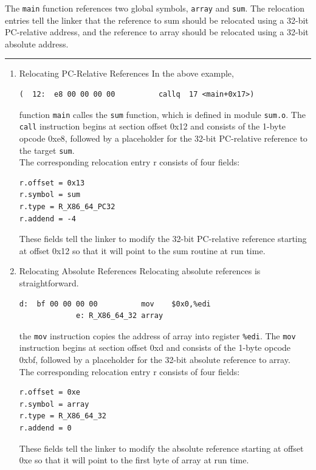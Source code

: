 \documentclass[11pt]{article}
\begin{document}
The \texttt{main} function references two global symbols, \texttt{array} and \texttt{sum}. The relocation entries tell the linker that the reference to sum should be relocated using a 32-bit PC-relative address, and the reference to array should be relocated using a 32-bit absolute address.\\

\noindent\rule{\textwidth}{0.5pt}

\begin{enumerate}
\item Relocating PC-Relative References
\label{sec:orgd8d7ded}
In the above example,\\
\begin{verbatim}
(  12:	e8 00 00 00 00       	callq  17 <main+0x17>)
\end{verbatim}
function \texttt{main} calles the \texttt{sum} function, which is defined in module \texttt{sum.o}. The \texttt{call} instruction begins at section offset 0x12 and consists of the 1-byte opcode 0xe8, followed by a placeholder for the 32-bit PC-relative reference to the target \texttt{sum}.\\

The corresponding relocation entry r consists of four fields:\\
\begin{verbatim}
r.offset = 0x13
r.symbol = sum
r.type = R_X86_64_PC32
r.addend = -4
\end{verbatim}
These fields tell the linker to modify the 32-bit PC-relative reference starting at offset 0x12 so that it will point to the sum routine at run time.\\

\item Relocating Absolute References
\label{sec:orgfd8c6cb}
Relocating absolute references is straightforward.\\
\begin{verbatim}
d:	bf 00 00 00 00       	mov    $0x0,%edi
		     e: R_X86_64_32	array
\end{verbatim}
the \texttt{mov} instruction copies the address of array into register \texttt{\%edi}. The \texttt{mov} instruction begins at section offset 0xd and consists of the 1-byte opcode 0xbf, followed by a placeholder for the 32-bit absolute reference to array.\\

The corresponding relocation entry r consists of four fields:\\
\begin{verbatim}
r.offset = 0xe 
r.symbol = array 
r.type = R_X86_64_32 
r.addend = 0
\end{verbatim}
These fields tell the linker to modify the absolute reference starting at offset 0xe so that it will point to the first byte of array at run time.\\


\end{enumerate}
\end{document}
